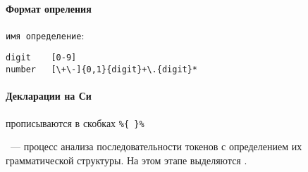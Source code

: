 \paragraph{Формат опреления} \verb|имя определение|:
\begin{verbatim}
digit    [0-9]
number   [\+\-]{0,1}{digit}+\.{digit}*
\end{verbatim}

\paragraph{Декларации на Си} прописываются в скобках \verb|%{ }%|





\begin{framed}\noindent
{}\ --- процесс анализа
последовательности токенов с определением их грамматической структуры. На этом
этапе выделяются .
\end{framed}




\secup
